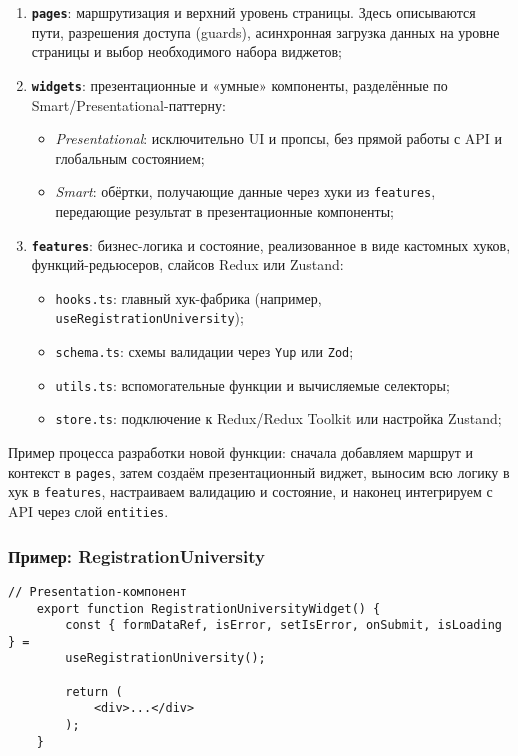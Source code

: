 \begin{enumerate}
	\item \textbf{\texttt{pages}}: маршрутизация и верхний уровень страницы. Здесь описываются пути, разрешения доступа (guards), асинхронная загрузка данных на уровне страницы и выбор необходимого набора виджетов;
	\item \textbf{\texttt{widgets}}: презентационные и «умные» компоненты, разделённые по Smart/Presentational-паттерну:
	\begin{itemize}
		\item \emph{Presentational}: исключительно UI и пропсы, без прямой работы с API и глобальным состоянием;
		\item \emph{Smart}: обёртки, получающие данные через хуки из \texttt{features}, передающие результат в презентационные компоненты;
	\end{itemize}
	\item \textbf{\texttt{features}}: бизнес-логика и состояние, реализованное в виде кастомных хуков, функций-редьюсеров, слайсов Redux или Zustand:
	\begin{itemize}
		\item \texttt{hooks.ts}: главный хук-фабрика (например, \texttt{useRegistrationUniversity});
		\item \texttt{schema.ts}: схемы валидации через \texttt{Yup} или \texttt{Zod};
		\item \texttt{utils.ts}: вспомогательные функции и вычисляемые селекторы;
		\item \texttt{store.ts}: подключение к Redux/Redux Toolkit или настройка Zustand;
	\end{itemize}
\end{enumerate}

Пример процесса разработки новой функции: сначала добавляем маршрут и контекст в \texttt{pages}, затем создаём презентационный виджет, выносим всю логику в хук в \texttt{features}, настраиваем валидацию и состояние, и наконец интегрируем с API через слой \texttt{entities}.

\subsubsection{Пример: RegistrationUniversity}

\begin{lstlisting}[breaklines=true,caption=RegistrationUniversityWidget]
	// Presentation-компонент
	export function RegistrationUniversityWidget() {
		const { formDataRef, isError, setIsError, onSubmit, isLoading } =
		useRegistrationUniversity();
		
		return (
			<div>...</div>
		);
	}
\end{lstlisting}

